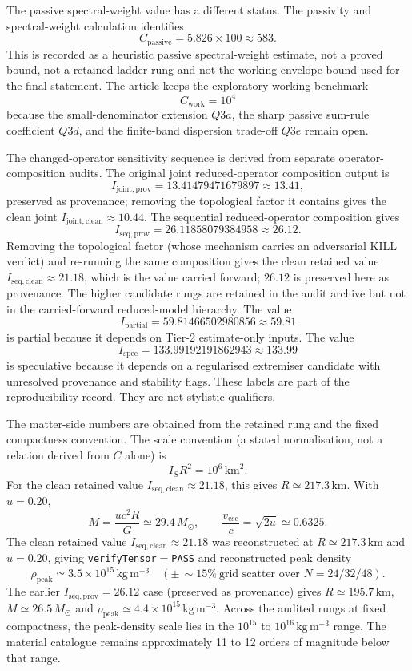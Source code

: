 \documentclass[11pt,a4paper]{article}
\begin{document}
The passive spectral-weight value has a different status. The passivity and spectral-weight calculation identifies
\[
C_{\mathrm{passive}} = 5.826\times100 \approx 583.
\]
This is recorded as a heuristic passive spectral-weight estimate, not a proved bound, not a retained ladder rung and not the working-envelope bound used for the final statement. The article keeps the exploratory working benchmark
\[
C_{\mathrm{work}}=10^{4}
\]
because the small-denominator extension $Q3a$, the sharp passive sum-rule coefficient $Q3d$, and the finite-band dispersion trade-off $Q3e$ remain open.

The changed-operator sensitivity sequence is derived from separate operator-composition audits. The original joint reduced-operator composition output is
\[
I_{\mathrm{joint,prov}} = 13.41479471679897 \approx 13.41,
\]
preserved as provenance; removing the topological factor it contains gives the clean joint $I_{\mathrm{joint,clean}}\approx10.44$.
The sequential reduced-operator composition gives
\[
I_{\mathrm{seq,prov}} = 26.11858079384958 \approx 26.12.
\]
Removing the topological factor (whose mechanism carries an adversarial KILL verdict) and re-running the same composition gives the clean retained value $I_{\mathrm{seq,clean}}\approx21.18$, which is the value carried forward; $26.12$ is preserved here as provenance.
The higher candidate rungs are retained in the audit archive but not in the carried-forward reduced-model hierarchy. The value
\[
I_{\mathrm{partial}}=59.81466502980856 \approx 59.81
\]
is partial because it depends on Tier-2 estimate-only inputs. The value
\[
I_{\mathrm{spec}}=133.99192191862943 \approx 133.99
\]
is speculative because it depends on a regularised extremiser candidate with unresolved provenance and stability flags. These labels are part of the reproducibility record. They are not stylistic qualifiers.

The matter-side numbers are obtained from the retained rung and the fixed compactness convention. The scale convention (a stated normalisation, not a relation derived from $C$ alone) is
\[
I_{S}R^{2}=10^{6}\,\mathrm{km}^{2}.
\]
For the clean retained value $I_{\mathrm{seq,clean}}\approx21.18$, this gives $R\simeq217.3\,\mathrm{km}$. With $u=0.20$,
\[
M=\frac{u c^{2}R}{G} \simeq 29.4\,M_{\odot},
\qquad
\frac{v_{\mathrm{esc}}}{c}=\sqrt{2u}\simeq0.6325.
\]
The clean retained value $I_{\mathrm{seq,clean}}\approx21.18$ was reconstructed at $R\simeq217.3\,\mathrm{km}$ and $u=0.20$, giving \texttt{verifyTensor}$=$\texttt{PASS} and reconstructed peak density
\[
\rho_{\mathrm{peak}} \simeq 3.5\times10^{15}\,\mathrm{kg\,m^{-3}}\quad(\pm\,{\sim}15\%\ \text{grid scatter over }N=24/32/48).
\]
The earlier $I_{\mathrm{seq,prov}}=26.12$ case (preserved as provenance) gives $R\simeq195.7\,\mathrm{km}$, $M\simeq26.5\,M_{\odot}$ and $\rho_{\mathrm{peak}}\simeq4.4\times10^{15}\,\mathrm{kg\,m^{-3}}$.
Across the audited rungs at fixed compactness, the peak-density scale lies in the $10^{15}$ to $10^{16}\,\mathrm{kg\,m^{-3}}$ range. The material catalogue remains approximately 11 to 12 orders of magnitude below that range.
\end{document}
